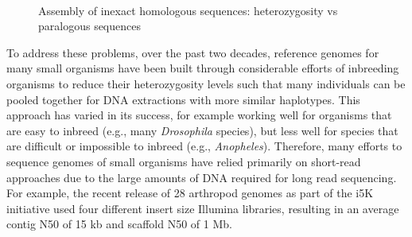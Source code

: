 \begin{figure}[htbp!]

\begin{centering}
\caption{Assembly of inexact homologous sequences: heterozygosity vs paralogous sequences}\label{figure:assembly}

 \\
\end{centering}

\end{figure}


\par{
To address these problems, over the past two decades, reference genomes for many small organisms have been built through considerable efforts of inbreeding organisms to reduce their heterozygosity levels such that many individuals can be pooled together for DNA extractions with more similar haplotypes. This approach has varied in its success, for example working well for organisms that are easy to inbreed (e.g., many \textit{Drosophila} species\cite{Drosophila_12_Genomes_Consortium2007-fx}), but less well for species that are difficult or impossible to inbreed (e.g., \textit{Anopheles}\cite{Neafsey2015-op}). Therefore, many efforts to sequence genomes of small organisms have relied primarily on short-read approaches due to the large amounts of DNA required for long read sequencing. For example, the recent release of 28 arthropod genomes as part of the i5K initiative used four different insert size Illumina libraries, resulting in an average contig N50 of 15 kb and scaffold N50 of 1 Mb\cite{Thomas2018-rk}.
} 

